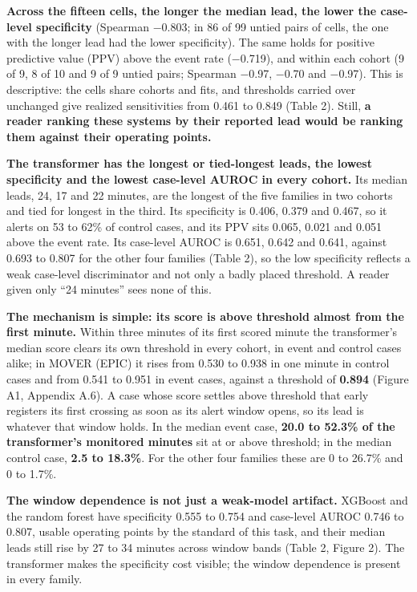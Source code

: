 \textbf{Across the fifteen cells, the longer the median lead, the lower the case-level specificity}
(Spearman $-$0.803; in 86 of 99 untied pairs of cells, the one with the longer lead had the lower
specificity). The same holds for positive predictive value (PPV) above the event rate ($-$0.719),
and within each cohort (9 of 9, 8 of 10 and 9 of 9 untied pairs; Spearman $-$0.97, $-$0.70 and
$-$0.97). This is descriptive: the cells share cohorts and fits, and thresholds carried over
unchanged give realized sensitivities from 0.461 to 0.849 (Table 2). Still, \textbf{a reader ranking
these systems by their reported lead would be ranking them against their operating points.}

\textbf{The transformer has the longest or tied-longest leads, the lowest specificity and the lowest
case-level AUROC in every cohort.} Its median leads, 24, 17 and 22 minutes, are the longest of the five families
in two cohorts and tied for longest in the third. Its specificity is 0.406, 0.379 and 0.467, so it
alerts on 53 to 62\% of control cases, and its PPV sits 0.065, 0.021 and 0.051 above the event rate.
Its case-level AUROC is 0.651, 0.642 and 0.641, against 0.693 to 0.807 for the other four
families (Table 2), so the low specificity reflects a weak case-level discriminator and not only
a badly placed threshold. A reader given only ``24 minutes'' sees none of this.

\textbf{The mechanism is simple: its score is above threshold almost from the first minute.} Within
three minutes of its first scored minute the transformer's median score clears its own threshold
in every cohort, in event and control cases alike; in MOVER (EPIC) it rises from 0.530 to 0.938
in one minute in control cases and from 0.541 to 0.951 in event cases, against a threshold of
\textbf{0.894} (Figure A1, Appendix A.6). A case whose score settles above threshold that early
registers its first crossing as soon as its alert window opens, so its lead is whatever that
window holds. In the median event case, \textbf{20.0 to 52.3\% of the transformer's monitored minutes} sit at or
above threshold; in the median control case, \textbf{2.5 to 18.3\%}. For the other four families these
are 0 to 26.7\% and 0 to 1.7\%.

\textbf{The window dependence is not just a weak-model artifact.} XGBoost and the random forest have
specificity 0.555 to 0.754 and case-level AUROC 0.746 to 0.807, usable operating points by the
standard of this task, and their median leads still rise by 27 to 34 minutes across window bands
(Table 2, Figure 2). The transformer makes the specificity cost visible; the window dependence is
present in every family.

